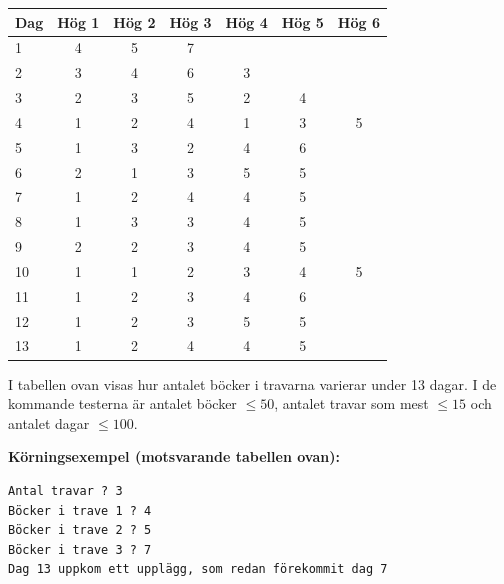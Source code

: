 \documentclass[a4paper,12pt]{article}
\begin{document}
\begin{center}
  \begin{tabular}{ l | c | c | c | c | c | c }
Dag	& Hög 1 & Hög 2	& Hög 3	& Hög 4	& Hög 5	& Hög 6 \\ \hline
1	&4	&5	&7	&   &   &	 \\
2	&3	&4	&6	&3	&   &	 \\
3	&2	&3	&5	&2	&4  &	 \\
4	&1	&2	&4	&1	&3	&5   \\
5	&1	&3	&2	&4	&6	&    \\
6	&2	&1	&3	&5	&5	&    \\
7	&1	&2	&4	&4	&5	&    \\
8	&1	&3	&3	&4	&5	&    \\
9	&2	&2	&3	&4	&5	&    \\
10	&1	&1	&2	&3	&4	&5   \\
11	&1	&2	&3	&4	&6	&    \\
12	&1	&2	&3	&5	&5	&    \\
13	&1	&2	&4	&4	&5  &    \\
  \end{tabular}
\end{center}


I tabellen ovan visas hur antalet böcker i travarna varierar under 13 dagar. I de kommande testerna är antalet böcker $\le50$, antalet travar som mest $\le15$ och antalet dagar $\le100$.

\textbf{Körningsexempel (motsvarande tabellen ovan):}
\begin{lstlisting}
Antal travar ? 3
Böcker i trave 1 ? 4
Böcker i trave 2 ? 5
Böcker i trave 3 ? 7
Dag 13 uppkom ett upplägg, som redan förekommit dag 7
\end{lstlisting}

\end{document}
